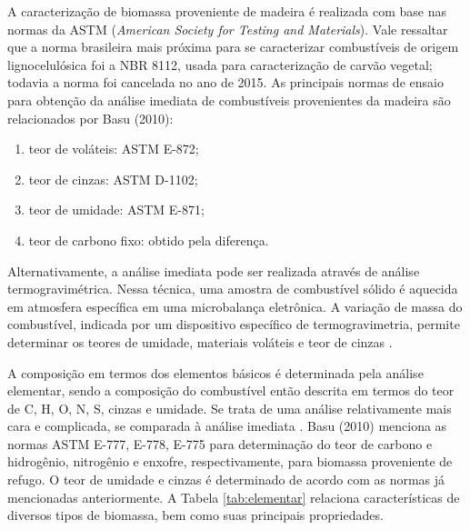 A caracterização de biomassa proveniente de madeira é realizada com base nas normas da ASTM (\textit{American Society for Testing and Materials}). Vale ressaltar que a norma brasileira mais próxima para se caracterizar combustíveis de origem lignocelulósica foi a NBR 8112, usada para caracterização de carvão vegetal; todavia a norma foi cancelada no ano de 2015. As principais normas de ensaio para obtenção da análise imediata de combustíveis provenientes da madeira são relacionados por Basu (2010):
\begin{enumerate}[noitemsep,nosep,labelindent=\parindent,leftmargin=*,label={\alph*}) ] 
	\item teor de voláteis: ASTM E-872;
	\item teor de cinzas: ASTM D-1102;
	\item teor de umidade: ASTM E-871;
	\item teor de carbono fixo: obtido pela diferença. 
\end{enumerate}

Alternativamente, a análise imediata pode ser realizada através de análise termogravimétrica. Nessa técnica, uma amostra de combustível sólido é aquecida em atmosfera específica em uma microbalança eletrônica. A variação de massa do combustível, indicada por um dispositivo específico de termogravimetria, permite determinar os teores de umidade, materiais voláteis e teor de cinzas \cite{Basu}.  

A composição em termos dos elementos básicos é determinada pela análise elementar, sendo a composição do combustível então descrita em termos do teor de C, H, O, N, S, cinzas e umidade. Se trata de uma análise relativamente mais cara e complicada, se comparada à análise imediata \cite{Basu}. Basu (2010) menciona as normas ASTM E-777, E-778, E-775 para determinação do teor de carbono e hidrogênio, nitrogênio e enxofre, respectivamente, para biomassa proveniente de refugo. O teor de umidade e cinzas é determinado de acordo com as normas já mencionadas anteriormente. A Tabela \ref{tab:elementar} relaciona características de diversos tipos de biomassa, bem como suas principais propriedades. 

